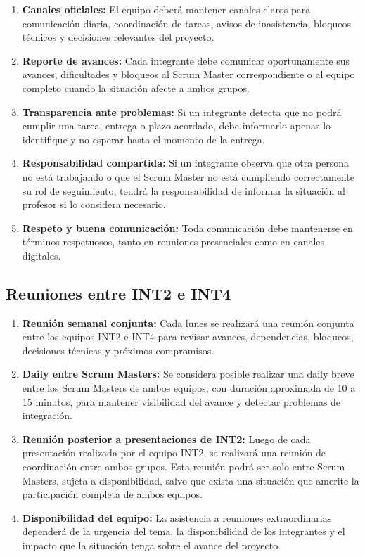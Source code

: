 \documentclass[12pt,a4paper]{article}
\begin{document}
\begin{enumerate}
    \item \textbf{Canales oficiales:} El equipo deberá mantener canales claros para comunicación diaria, coordinación de tareas, avisos de inasistencia, bloqueos técnicos y decisiones relevantes del proyecto.

    \item \textbf{Reporte de avances:} Cada integrante debe comunicar oportunamente sus avances, dificultades y bloqueos al Scrum Master correspondiente o al equipo completo cuando la situación afecte a ambos grupos.

    \item \textbf{Transparencia ante problemas:} Si un integrante detecta que no podrá cumplir una tarea, entrega o plazo acordado, debe informarlo apenas lo identifique y no esperar hasta el momento de la entrega.

    \item \textbf{Responsabilidad compartida:} Si un integrante observa que otra persona no está trabajando o que el Scrum Master no está cumpliendo correctamente su rol de seguimiento, tendrá la responsabilidad de informar la situación al profesor si lo considera necesario.

    \item \textbf{Respeto y buena comunicación:} Toda comunicación debe mantenerse en términos respetuosos, tanto en reuniones presenciales como en canales digitales.
\end{enumerate}

\subsection{Reuniones entre INT2 e INT4}

\begin{enumerate}
    \item \textbf{Reunión semanal conjunta:} Cada lunes se realizará una reunión conjunta entre los equipos INT2 e INT4 para revisar avances, dependencias, bloqueos, decisiones técnicas y próximos compromisos.

    \item \textbf{Daily entre Scrum Masters:} Se considera posible realizar una daily breve entre los Scrum Masters de ambos equipos, con duración aproximada de 10 a 15 minutos, para mantener visibilidad del avance y detectar problemas de integración.

    \item \textbf{Reunión posterior a presentaciones de INT2:} Luego de cada presentación realizada por el equipo INT2, se realizará una reunión de coordinación entre ambos grupos. Esta reunión podrá ser solo entre Scrum Masters, sujeta a disponibilidad, salvo que exista una situación que amerite la participación completa de ambos equipos.

    \item \textbf{Disponibilidad del equipo:} La asistencia a reuniones extraordinarias dependerá de la urgencia del tema, la disponibilidad de los integrantes y el impacto que la situación tenga sobre el avance del proyecto.
\end{enumerate}
\end{document}
